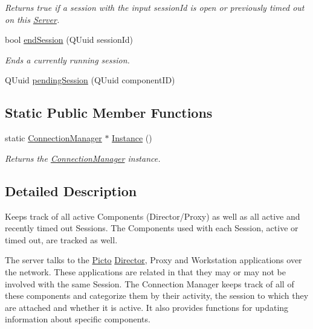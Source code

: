 \begin{DoxyCompactItemize}
\begin{DoxyCompactList}\small\item\em Returns true if a session with the input session\-Id is open or previously timed out on this \hyperlink{class_server}{Server}. \end{DoxyCompactList}\item 
bool \hyperlink{class_connection_manager_ad70ceceadb24b53fc7bf9c04526dcbf5}{end\-Session} (Q\-Uuid session\-Id)
\begin{DoxyCompactList}\small\item\em Ends a currently running session. \end{DoxyCompactList}\item 
Q\-Uuid \hyperlink{class_connection_manager_aab7005e98b0721aa376e3ad37e96bd7f}{pending\-Session} (Q\-Uuid component\-I\-D)
\end{DoxyCompactItemize}
\subsection*{Static Public Member Functions}
\begin{DoxyCompactItemize}
\item 
static \hyperlink{class_connection_manager}{Connection\-Manager} $\ast$ \hyperlink{class_connection_manager_aa4061f5b6a3cb842f3ecce80d776db0d}{Instance} ()
\begin{DoxyCompactList}\small\item\em Returns the \hyperlink{class_connection_manager}{Connection\-Manager} instance. \end{DoxyCompactList}\end{DoxyCompactItemize}


\subsection{Detailed Description}
Keeps track of all active Components (Director/\-Proxy) as well as all active and recently timed out Sessions. The Components used with each Session, active or timed out, are tracked as well. 

The server talks to the \hyperlink{namespace_picto}{Picto} \hyperlink{class_director}{Director}, Proxy and Workstation applications over the network. These applications are related in that they may or may not be involved with the same Session. The Connection Manager keeps track of all of these components and categorize them by their activity, the session to which they are attached and whether it is active. It also provides functions for updating information about specific components.

